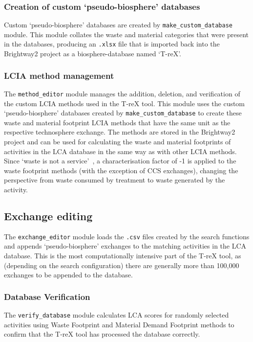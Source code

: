 \subsubsection{Creation of custom `pseudo-biosphere' databases}
Custom `pseudo-biosphere' databases are created by \texttt{make\_custom\_database} module. This module collates the waste and material categories that were present in the databases, producing an \texttt{.xlsx} file that is imported back into the Brightway2 project as a biosphere-database named `T-reX'. 

\subsubsection{LCIA method management}
The \texttt{method\_editor} module manages the addition, deletion, and verification of the custom LCIA methods used in the T-reX tool. This module uses the custom `pseudo-biosphere' databases created by \texttt{make\_custom\_database} to create these waste and material footprint LCIA methods that have the same unit as the respective technosphere exchange. The methods are stored in the Brightway2 project and can be used for calculating the waste and material footprints of activities in the LCA database in the same way as with other LCIA methods. Since `waste is not a service'~\citep{guinee2021wasteisnotaservice}, a characterisation factor of -1 is applied to the waste footprint methods (with the exception of CCS exchanges), changing the perspective from waste consumed by treatment to waste generated by the activity.

\subsection{Exchange editing}
The \texttt{exchange\_editor} module loads the \texttt{.csv} files created by the search functions and appends `pseudo-biosphere' exchanges to the matching activities in the LCA database. This is the most computationally intensive part of the T-reX tool, as (depending on the search configuration) there are generally more than 100,000 exchanges to be appended to the database. 

\subsubsection{Database Verification}
The \texttt{verify\_database} module calculates LCA scores for randomly selected activities using Waste Footprint and Material Demand Footprint methods to confirm that the T-reX tool has processed the database correctly.

